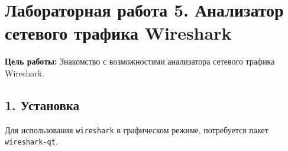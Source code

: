 \chapter*{Лабораторная работа 5. Анализатор сетевого трафика Wireshark}

\textbf{Цель работы:} Знакомство с возможностями анализатора сетевого трафика Wireshark.

\section*{1. Установка}

Для использования \texttt{wireshark} в графическом режиме, потребуется пакет \texttt{wireshark-qt}.
